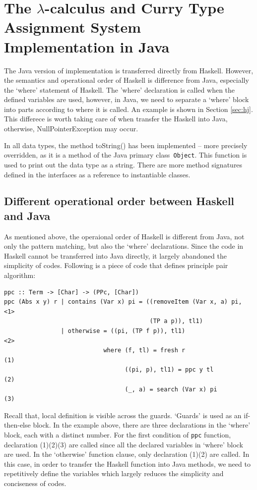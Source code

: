 \chapter{The $\lambda$-calculus and Curry Type Assignment System Implementation in Java}
The Java version of implementation is transferred directly from Haskell. However, the semantics and operational order of Haskell is difference from Java, especially the `where' statement of Haskell. The 'where' declaration is called when the defined variables are used, however, in Java, we need to separate a `where' block into parts according to where it is called. An example is shown in Section \ref{sec:hj}. This differece is worth taking care of when transfer the Haskell into Java, otherwise, NullPointerException may occur. 

In all data types, the method toString() has been implemented -- more precisely overridden, as it is a method of the Java primary class\verb| Object|. This function is used to print out the data type as a string. There are more method signatures defined in the interfaces as a reference to instantiable classes. 

\section{Different operational order between Haskell and Java}{\label{sec:hj}}
As mentioned above, the operaional order of Haskell is different from Java, not only the pattern matching, but also the `where' declarations. Since the code in Haskell cannot be transferred into Java directly, it largely abandoned the simplicity of codes. Following is a piece of code that defines principle pair algorithm:
\begin{verbatim}
ppc :: Term -> [Char] -> (PPc, [Char])
ppc (Abs x y) r | contains (Var x) pi = ((removeItem (Var x, a) pi,    <1>
                                         (TP a p)), tl1)
                | otherwise = ((pi, (TP f p)), tl1)                    <2>
                            where (f, tl) = fresh r                    (1) 
                                  ((pi, p), tl1) = ppc y tl            (2)
                                  (_, a) = search (Var x) pi           (3)

\end{verbatim}

Recall that, local definition is visible across the guards. `Guards' is used as an if-then-else block. In the example above, there are three declarations in the `where' block, each with a distinct number. For the first condition of \texttt{ppc} function, declaration (1)(2)(3) are called since all the declared variables in `where' block are used. In the `otherwise' function clause, only declaration (1)(2) are called. In this case, in order to transfer the Haskell function into Java methods, we need to repetitively define the variables which largely reduces the simplicity and conciseness of codes. 

